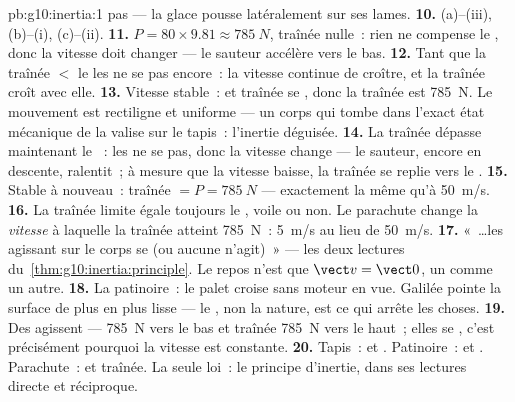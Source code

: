 \begin{solution}{pb:g10:inertia:1}
pas --- la glace pousse latéralement sur ses lames.
\textbf{10.} (a)--(iii), (b)--(i), (c)--(ii).
\textbf{11.}  $P = 80 \times 9.81 \approx \qty{785}{N}$,
traînée nulle~: rien ne compense le
, donc la vitesse doit changer --- le sauteur
accélère vers le bas.
\textbf{12.} Tant que la traînée $<$ le  les
 ne se  pas encore~: la
vitesse continue de croître, et la traînée croît avec elle.
\textbf{13.} Vitesse stable~:  et traînée se
, donc la traînée est \qty{785}{N}. Le
mouvement est rectiligne et uniforme --- un corps qui tombe dans
l'exact état mécanique de la valise sur le tapis~: l'inertie déguisée.
\textbf{14.} La traînée dépasse maintenant le
~: les  ne se
 pas, donc la vitesse change --- le
sauteur, encore en descente, ralentit~; à mesure que la vitesse
baisse, la traînée se replie vers le .
\textbf{15.} Stable à nouveau~: traînée $= P = \qty{785}{N}$ ---
exactement la même qu'à \qty{50}{m/s}.
\textbf{16.} La traînée limite égale toujours le
, voile ou non. Le parachute change la
\emph{vitesse} à laquelle la traînée atteint \qty{785}{N}~:
\qty{5}{m/s} au lieu de \qty{50}{m/s}.
\textbf{17.} «~\dots les  agissant sur le corps se
 (ou aucune n'agit)~» --- les deux lectures
du~\cref{thm:g10:inertia:principle}. Le repos n'est que
$\vect v = \vect 0$, un 
comme un autre.
\textbf{18.} La patinoire~: le palet croise sans moteur en vue.
Galilée pointe la surface de plus en plus lisse --- le
, non la nature, est ce qui arrête les choses.
\textbf{19.} Des  agissent ---
 \qty{785}{N} vers le bas et traînée
\qty{785}{N} vers le haut~; elles se
\emph{}, c'est précisément pourquoi la
vitesse est constante.
\textbf{20.} Tapis~:  et
. Patinoire~:  et
. Parachute~:  et
traînée. La seule loi~: le principe d'inertie, dans ses lectures
directe et réciproque.
\end{solution}
